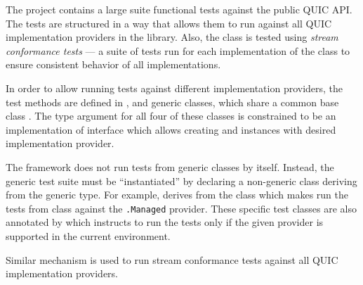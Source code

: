 The  project contains a large suite functional tests against the public
QUIC API. The tests are structured in a way that allows them to run against all QUIC implementation
providers in the library. Also, the \QuicStream{} class is tested using \textit{stream conformance
  tests} --- a suite of tests run for each implementation of the \Stream{} class to ensure consistent
behavior of all implementations.

In order to allow running tests against different implementation providers, the test methods are
defined in \QuicListenerTests{}, \QuicConnectionTests{} and \QuicStreamTests{} generic classes,
which share a common base class \QuicTestBase{}. The type argument for all four of these classes is
constrained to be an implementation of  interface which allows
creating \QuicListener{} and \QuicConnection{} instances with desired implementation provider.

The \xUnit{} framework does not run tests from generic classes by itself. Instead, the generic test
suite must be ``instantiated'' by declaring a non-generic class deriving from the generic type. For
example,  derives from the
 class which makes
\xUnit{} run the tests from \QuicStreamTests{} class against the
\texttt{\QuicImplementationProviders{}.Managed} provider. These specific test classes are also
annotated by  which instructs \xUnit{} to run the tests only if the
given provider is supported in the current environment.

Similar mechanism is used to run stream conformance tests against all QUIC implementation providers.
